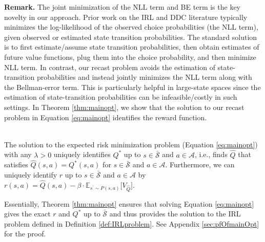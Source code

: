 \noindent\textbf{Remark.} The joint minimization of the NLL term and BE term is the key novelty in our approach. Prior work on the IRL and DDC literature \citep{hotz1993conditional, zeng2023understanding} typically minimizes the log-likelihood of the observed choice probabilities (the NLL term), given observed or estimated state transition probabilities. The standard solution is to first estimate/assume state transition probabilities, then obtain estimates of future value functions, plug them into the choice probability, and then minimize NLL term. In contrast, our recast problem avoids the estimation of state-transition probabilities and instead jointly minimizes the NLL term along with the Bellman-error term. This is particularly helpful in large-state spaces since the estimation of state-transition probabilities can be infeasible/costly in such settings. In Theorem \ref{thm:mainopt}, we show that the solution to our recast problem in Equation \eqref{eq:mainopt} identifies the reward function. 

\begin{thm}
\label{thm:mainopt} 
\;
\\
The solution to the expected risk minimization problem (Equation \eqref{eq:mainopt}) with any $\lambda>0$
uniquely identifies $Q^\ast$ up to $s\in\bar{\mathcal{S}}
$ and $a \in \mathcal{A}$, i.e., finds $\widehat{Q}$ that satisfies $\widehat{Q}(s,a)=Q^\ast(s,a)$ for  $s\in\bar{\mathcal{S}}
$ and $a \in \mathcal{A}$. Furthermore, we can uniquely identify $r$ up to $s\in\bar{\mathcal{S}}$ and $a \in \mathcal{A}$ by $r(s, a)= \widehat{Q}(s, a) -  \beta \cdot \mathbb{E}_{s^{\prime} \sim P(s, a)} 
    \bigl[ V_{\widehat{Q}} \bigr]$.
\end{thm}
\noindent Essentially, Theorem \ref{thm:mainopt} ensures that solving Equation \eqref{eq:mainopt} gives the exact $r$ and $Q^\ast$ up to 
$\bar{\mathcal{S}}$ and thus provides the solution to the IRL problem defined in Definition \ref{def:IRLproblem}. See Appendix \ref{sec:pfOfmainOpt} for the proof. 

